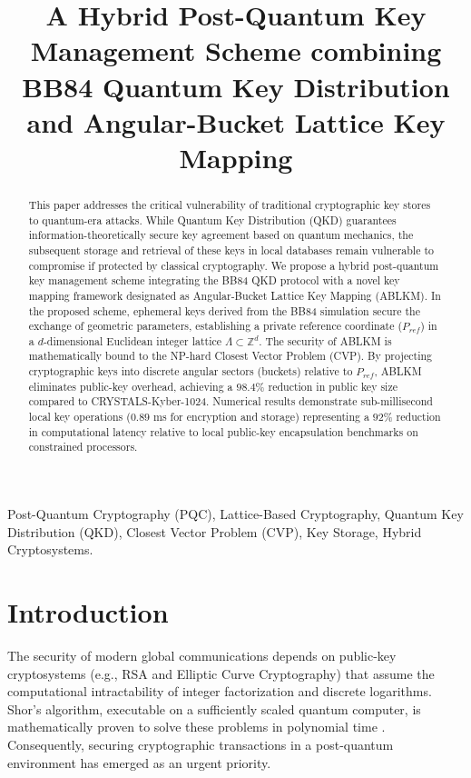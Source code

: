 \documentclass[conference,a4paper]{IEEEtran}
\begin{document}
\title{A Hybrid Post-Quantum Key Management Scheme combining BB84 Quantum Key Distribution and Angular-Bucket Lattice Key Mapping}

\author{
}

\maketitle

\begin{abstract}
This paper addresses the critical vulnerability of traditional cryptographic key stores to quantum-era attacks. While Quantum Key Distribution (QKD) guarantees information-theoretically secure key agreement based on quantum mechanics, the subsequent storage and retrieval of these keys in local databases remain vulnerable to compromise if protected by classical cryptography. We propose a hybrid post-quantum key management scheme integrating the BB84 QKD protocol with a novel key mapping framework designated as Angular-Bucket Lattice Key Mapping (ABLKM). In the proposed scheme, ephemeral keys derived from the BB84 simulation secure the exchange of geometric parameters, establishing a private reference coordinate ($P_{ref}$) in a $d$-dimensional Euclidean integer lattice $\Lambda \subset \mathbb{Z}^d$. The security of ABLKM is mathematically bound to the NP-hard Closest Vector Problem (CVP). By projecting cryptographic keys into discrete angular sectors (buckets) relative to $P_{ref}$, ABLKM eliminates public-key overhead, achieving a $98.4\%$ reduction in public key size compared to CRYSTALS-Kyber-1024. Numerical results demonstrate sub-millisecond local key operations ($0.89$ ms for encryption and storage) representing a $92\%$ reduction in computational latency relative to local public-key encapsulation benchmarks on constrained processors.
\end{abstract}

\begin{IEEEkeywords}
Post-Quantum Cryptography (PQC), Lattice-Based Cryptography, Quantum Key Distribution (QKD), Closest Vector Problem (CVP), Key Storage, Hybrid Cryptosystems.
\end{IEEEkeywords}

\section{Introduction}
The security of modern global communications depends on public-key cryptosystems (e.g., RSA and Elliptic Curve Cryptography) that assume the computational intractability of integer factorization and discrete logarithms. Shor's algorithm, executable on a sufficiently scaled quantum computer, is mathematically proven to solve these problems in polynomial time \cite{shor}. Consequently, securing cryptographic transactions in a post-quantum environment has emerged as an urgent priority.
\end{document}
